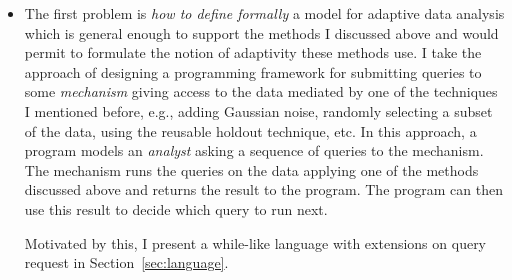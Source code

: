 \begin{itemize}
    \item
The first problem is \emph{how to define formally} a model for adaptive data analysis which is general enough to support the methods I discussed above and would permit to formulate the notion of adaptivity these methods use. 
I take the approach of designing a programming framework for submitting queries to some \emph{mechanism} giving access to the data mediated by one of the techniques I mentioned before, e.g., adding Gaussian noise, randomly selecting a subset of the data, using the reusable holdout technique, etc. 
In this approach, a program models an \emph{analyst} asking a sequence of queries to the mechanism. The mechanism runs the queries on the data applying one of the methods discussed above and returns the result to the program. The program can then use this result to decide which query to run next. 

Motivated by this, I present a while-like language with extensions on query request in Section~\ref{sec:language}.


\end{itemize}
